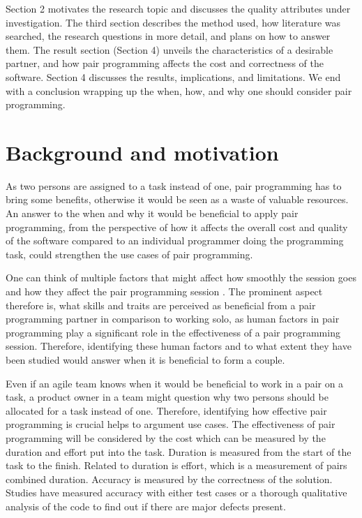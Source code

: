 \documentclass[conference]{IEEEtran}
\begin{document}
Section 2 motivates the research topic and discusses the quality attributes under investigation. The third section describes the method used, how literature was searched, the research questions in more detail, and plans on how to answer them. The result section (Section 4) unveils the characteristics of a desirable partner, and how pair programming affects the cost and correctness of the software. Section 4 discusses the results, implications, and limitations. We end with a conclusion wrapping up the when, how, and why one should consider pair programming.

\section{Background and motivation}

As two persons are assigned to a task instead of one, pair programming has to bring some benefits, otherwise it would be seen as a waste of valuable resources. An answer to the when and why it would be beneficial to apply pair programming, from the perspective of how it affects the overall cost and quality of the software compared to an individual programmer doing the programming task, could strengthen the use cases of pair programming.

One can think of multiple factors that might affect how smoothly the session goes and how they affect the pair programming session \cite{10.1145/1414004.1414026}. The prominent aspect therefore is, what skills and traits are perceived as beneficial from a pair programming partner in comparison to working solo, as human factors in pair programming play a significant role in the effectiveness of a pair programming session. Therefore, identifying these human factors and to what extent they have been studied would answer when it is beneficial to form a couple.

Even if an agile team knows when it would be beneficial to work in a pair on a task, a product owner in a team might question why two persons should be allocated for a task instead of one. Therefore, identifying how effective pair programming is crucial helps to argument use cases. The effectiveness of pair programming will be considered by the cost which can be measured by the duration and effort put into the task. Duration is measured from the start of the task to the finish. Related to duration is effort, which is a measurement of pairs combined duration. Accuracy is measured by the correctness of the solution. Studies have measured accuracy with either test cases or a thorough qualitative analysis of the code to find out if there are major defects present. 
\end{document}
